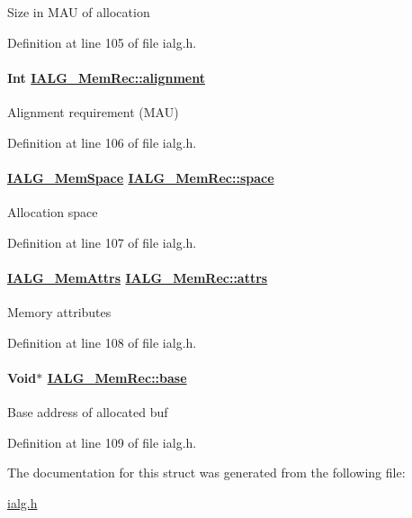 Size in MAU of allocation 

Definition at line 105 of file ialg.h.\hypertarget{struct_i_a_l_g___mem_rec_86daec3754a4b918fff07efe28461748}{
\paragraph[alignment]{\setlength{\rightskip}{0pt plus 5cm}Int \hyperlink{struct_i_a_l_g___mem_rec_86daec3754a4b918fff07efe28461748}{IALG\_\-Mem\-Rec::alignment}}\hfill}
\label{struct_i_a_l_g___mem_rec_86daec3754a4b918fff07efe28461748}


Alignment requirement (MAU) 

Definition at line 106 of file ialg.h.\hypertarget{struct_i_a_l_g___mem_rec_41e307f25d01a4329f4f4bd794c9087c}{
\paragraph[space]{\setlength{\rightskip}{0pt plus 5cm}\hyperlink{group__ti__xdais___i_a_l_g_g262eb64dc7343999fa07d535ae163497}{IALG\_\-Mem\-Space} \hyperlink{struct_i_a_l_g___mem_rec_41e307f25d01a4329f4f4bd794c9087c}{IALG\_\-Mem\-Rec::space}}\hfill}
\label{struct_i_a_l_g___mem_rec_41e307f25d01a4329f4f4bd794c9087c}


Allocation space 

Definition at line 107 of file ialg.h.\hypertarget{struct_i_a_l_g___mem_rec_a9dca3a637dc7e26069f4a11e7c82593}{
\paragraph[attrs]{\setlength{\rightskip}{0pt plus 5cm}\hyperlink{group__ti__xdais___i_a_l_g_g805f1c1330403c05633277a073862e3d}{IALG\_\-Mem\-Attrs} \hyperlink{struct_i_a_l_g___mem_rec_a9dca3a637dc7e26069f4a11e7c82593}{IALG\_\-Mem\-Rec::attrs}}\hfill}
\label{struct_i_a_l_g___mem_rec_a9dca3a637dc7e26069f4a11e7c82593}


Memory attributes 

Definition at line 108 of file ialg.h.\hypertarget{struct_i_a_l_g___mem_rec_2a51de211c96021ca4aa360e352aa90f}{
\paragraph[base]{\setlength{\rightskip}{0pt plus 5cm}Void$\ast$ \hyperlink{struct_i_a_l_g___mem_rec_2a51de211c96021ca4aa360e352aa90f}{IALG\_\-Mem\-Rec::base}}\hfill}
\label{struct_i_a_l_g___mem_rec_2a51de211c96021ca4aa360e352aa90f}


Base address of allocated buf 

Definition at line 109 of file ialg.h.

The documentation for this struct was generated from the following file:\begin{CompactItemize}
\item 
\hyperlink{ialg_8h}{ialg.h}\end{CompactItemize}
